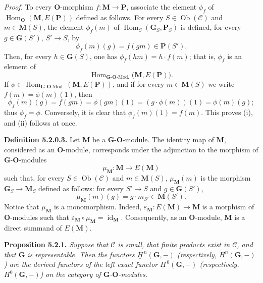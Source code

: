 \medskip
\noindent\textit{Proof.}
To every \(\mathbf O\)-morphism \(f:\mathbf M\to\mathbf P\), associate
the element \(\phi_f\) of
\(\operatorname{Hom}_{\mathbf O}(\mathbf M,E(\mathbf P))\) defined as
follows. For every \(S\in\operatorname{Ob}(\mathscr C)\) and
\(m\in\mathbf M(S)\), the element \(\phi_f(m)\) of
\(\operatorname{Hom}_S(\mathbf G_S,\mathbf P_S)\) is defined, for every
\(g\in\mathbf G(S')\), \(S'\to S\), by
\[
  \phi_f(m)(g)=f(gm)\in\mathbf P(S').
\]
Then, for every \(h\in\mathbf G(S)\), one has
\(\phi_f(hm)=h\cdot f(m)\); that is, \(\phi_f\) is an element of
\[
  \operatorname{Hom}_{\mathbf G\text{-}\mathbf O\text{-Mod.}}
    \bigl(\mathbf M,E(\mathbf P)\bigr).
\]
If
\(\phi\in\operatorname{Hom}_{\mathbf G\text{-}\mathbf O\text{-Mod.}}
  (\mathbf M,E(\mathbf P))\), and if for every \(m\in\mathbf M(S)\) we
write \(f(m)=\phi(m)(1)\), then
\[
  \phi_f(m)(g)
    =f(gm)
    =\phi(gm)(1)
    =(g\cdot\phi(m))(1)
    =\phi(m)(g);
\]
thus \(\phi_f=\phi\). Conversely, it is clear that
\(\phi_f(m)(1)=f(m)\). This proves (i), and (ii) follows at once.

\medskip
\noindent\textbf{Definition 5.2.0.3.}
Let \(\mathbf M\) be a \(\mathbf G\)-\(\mathbf O\)-module. The identity
map of \(\mathbf M\), considered as an \(\mathbf O\)-module, corresponds
under the adjunction to the morphism of
\(\mathbf G\)-\(\mathbf O\)-modules
\[
  \mu_{\mathbf M}:\mathbf M\longrightarrow E(\mathbf M)
\]
such that, for every \(S\in\operatorname{Ob}(\mathscr C)\) and
\(m\in\mathbf M(S)\), \(\mu_{\mathbf M}(m)\) is the morphism
\(\mathbf G_S\to\mathbf M_S\) defined as follows: for every
\(S'\to S\) and \(g\in\mathbf G(S')\),
\[
  \mu_{\mathbf M}(m)(g)=g\cdot m_{S'}\in\mathbf M(S').
\]
Notice that \(\mu_{\mathbf M}\) is a monomorphism. Indeed,
\(\varepsilon_{\mathbf M}:E(\mathbf M)\to\mathbf M\) is a morphism of
\(\mathbf O\)-modules such that
\(\varepsilon_{\mathbf M}\circ\mu_{\mathbf M}
  =\operatorname{id}_{\mathbf M}\). Consequently, as an
\(\mathbf O\)-module, \(\mathbf M\) is a direct summand of
\(E(\mathbf M)\).

\medskip
\noindent\textbf{Proposition 5.2.1.}
\textit{Suppose that \(\mathscr C\) is small, that finite products exist
in \(\mathscr C\), and that \(\mathbf G\) is representable. Then the
functors \(\underline H^{\,n}(\mathbf G,-)\) (respectively,
\(H^n(\mathbf G,-)\)) are the derived functors of the left exact functor
\(\underline H^{\,0}(\mathbf G,-)\) (respectively,
\(H^0(\mathbf G,-)\)) on the category of
\(\mathbf G\)-\(\mathbf O\)-modules.}


